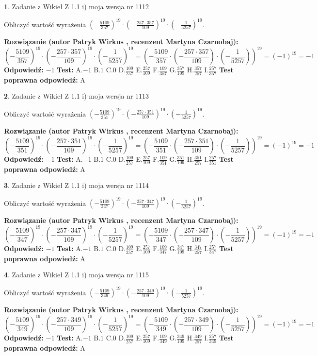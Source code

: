 \documentclass[12pt, a4paper]{article}
\theoremstyle{definition} %
\newtheorem{zad}{}
\newcommand{\zadStart}[1]{\begin{zad}#1\newline}
\newcommand{\zadStop}{\end{zad}}
\newcommand{\rozwStart}[2]{\noindent \textbf{Rozwiązanie (autor #1 , recenzent #2): }\newline}
\newcommand{\rozwStop}{\newline}
\newcommand{\odpStart}{\noindent \textbf{Odpowiedź:}\newline}
\newcommand{\odpStop}{\newline}
\newcommand{\testStart}{\noindent \textbf{Test:}\newline}
\newcommand{\testStop}{\newline}
\newcommand{\kluczStart}{\noindent \textbf{Test poprawna odpowiedź:}\newline}
\newcommand{\kluczStop}{\newline}
\begin{document}
\zadStart{Zadanie z Wikieł Z 1.1 i) moja wersja nr 1112}

Obliczyć wartość wyrażenia $(-\frac{5109}{357})^{19} \cdot (-\frac{257 \cdot 357}{109})^{19} \cdot (-\frac{1}{5257})^{19}$.
\zadStop
\rozwStart{Patryk Wirkus}{Martyna Czarnobaj}
$$(-\frac{5109}{357})^{19} \cdot (-\frac{257 \cdot 357}{109})^{19} \cdot (-\frac{1}{5257})^{19} = (-\frac{5109}{357} \cdot (-\frac{257 \cdot 357}{109}) \cdot (-\frac{1}{5257}))^{19} = (-1)^{19} = -1$$
\rozwStop
\odpStart
$-1$
\odpStop
\testStart
A.$-1$ B.$1$ C.$0$ D.$\frac{109}{257}$ E.$\frac{257}{109}$
F.$\frac{109}{357}$ G.$\frac{357}{109}$
H.$\frac{357}{257}$
I.$\frac{257}{357}$
\testStop
\kluczStart
A
\kluczStop



\zadStart{Zadanie z Wikieł Z 1.1 i) moja wersja nr 1113}

Obliczyć wartość wyrażenia $(-\frac{5109}{351})^{19} \cdot (-\frac{257 \cdot 351}{109})^{19} \cdot (-\frac{1}{5257})^{19}$.
\zadStop
\rozwStart{Patryk Wirkus}{Martyna Czarnobaj}
$$(-\frac{5109}{351})^{19} \cdot (-\frac{257 \cdot 351}{109})^{19} \cdot (-\frac{1}{5257})^{19} = (-\frac{5109}{351} \cdot (-\frac{257 \cdot 351}{109}) \cdot (-\frac{1}{5257}))^{19} = (-1)^{19} = -1$$
\rozwStop
\odpStart
$-1$
\odpStop
\testStart
A.$-1$ B.$1$ C.$0$ D.$\frac{109}{257}$ E.$\frac{257}{109}$
F.$\frac{109}{351}$ G.$\frac{351}{109}$
H.$\frac{351}{257}$
I.$\frac{257}{351}$
\testStop
\kluczStart
A
\kluczStop



\zadStart{Zadanie z Wikieł Z 1.1 i) moja wersja nr 1114}

Obliczyć wartość wyrażenia $(-\frac{5109}{347})^{19} \cdot (-\frac{257 \cdot 347}{109})^{19} \cdot (-\frac{1}{5257})^{19}$.
\zadStop
\rozwStart{Patryk Wirkus}{Martyna Czarnobaj}
$$(-\frac{5109}{347})^{19} \cdot (-\frac{257 \cdot 347}{109})^{19} \cdot (-\frac{1}{5257})^{19} = (-\frac{5109}{347} \cdot (-\frac{257 \cdot 347}{109}) \cdot (-\frac{1}{5257}))^{19} = (-1)^{19} = -1$$
\rozwStop
\odpStart
$-1$
\odpStop
\testStart
A.$-1$ B.$1$ C.$0$ D.$\frac{109}{257}$ E.$\frac{257}{109}$
F.$\frac{109}{347}$ G.$\frac{347}{109}$
H.$\frac{347}{257}$
I.$\frac{257}{347}$
\testStop
\kluczStart
A
\kluczStop



\zadStart{Zadanie z Wikieł Z 1.1 i) moja wersja nr 1115}

Obliczyć wartość wyrażenia $(-\frac{5109}{349})^{19} \cdot (-\frac{257 \cdot 349}{109})^{19} \cdot (-\frac{1}{5257})^{19}$.
\zadStop
\rozwStart{Patryk Wirkus}{Martyna Czarnobaj}
$$(-\frac{5109}{349})^{19} \cdot (-\frac{257 \cdot 349}{109})^{19} \cdot (-\frac{1}{5257})^{19} = (-\frac{5109}{349} \cdot (-\frac{257 \cdot 349}{109}) \cdot (-\frac{1}{5257}))^{19} = (-1)^{19} = -1$$
\rozwStop
\odpStart
$-1$
\odpStop
\testStart
A.$-1$ B.$1$ C.$0$ D.$\frac{109}{257}$ E.$\frac{257}{109}$
F.$\frac{109}{349}$ G.$\frac{349}{109}$
H.$\frac{349}{257}$
I.$\frac{257}{349}$
\testStop
\kluczStart
A
\kluczStop
\end{document}
